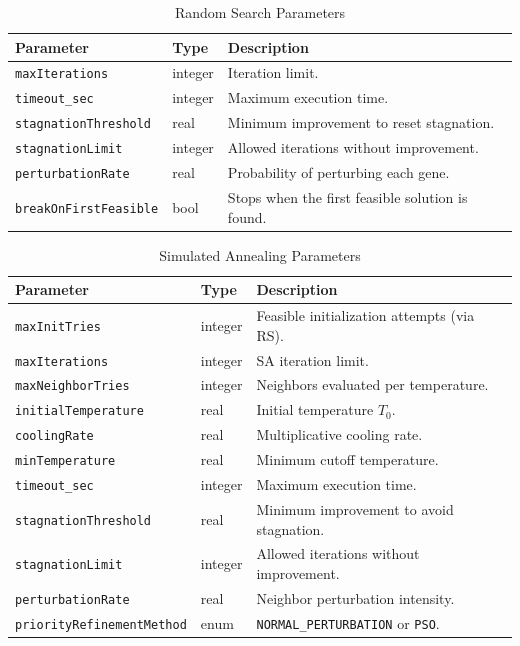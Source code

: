 \begin{table}[h]
\centering
\caption{Random Search Parameters}
\begin{tabular}{lll}
\toprule
Parameter & Type & Description \\
\midrule
\texttt{maxIterations} & integer & Iteration limit. \\
\texttt{timeout\_sec} & integer & Maximum execution time. \\
\texttt{stagnationThreshold} & real & Minimum improvement to reset stagnation. \\
\texttt{stagnationLimit} & integer & Allowed iterations without improvement. \\
\texttt{perturbationRate} & real & Probability of perturbing each gene. \\
\texttt{breakOnFirstFeasible} & bool & Stops when the first feasible solution is found. \\
\bottomrule
\end{tabular}
\end{table}

\begin{table}[h]
\centering
\caption{Simulated Annealing Parameters}
\begin{tabular}{lll}
\toprule
Parameter & Type & Description \\
\midrule
\texttt{maxInitTries} & integer & Feasible initialization attempts (via RS). \\
\texttt{maxIterations} & integer & SA iteration limit. \\
\texttt{maxNeighborTries} & integer & Neighbors evaluated per temperature. \\
\texttt{initialTemperature} & real & Initial temperature $T_0$. \\
\texttt{coolingRate} & real & Multiplicative cooling rate. \\
\texttt{minTemperature} & real & Minimum cutoff temperature. \\
\texttt{timeout\_sec} & integer & Maximum execution time. \\
\texttt{stagnationThreshold} & real & Minimum improvement to avoid stagnation. \\
\texttt{stagnationLimit} & integer & Allowed iterations without improvement. \\
\texttt{perturbationRate} & real & Neighbor perturbation intensity. \\
\texttt{priorityRefinementMethod} & enum & \texttt{NORMAL\_PERTURBATION} or \texttt{PSO}. \\
\bottomrule
\end{tabular}
\end{table}


